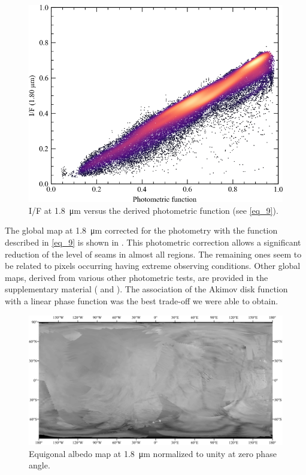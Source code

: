 \documentclass{arxiv-icarus}
\begin{document}
\begin{figure}[!ht]
    \includegraphics[width=.9\linewidth]{Fig_6}
    \caption{I/F at \SI{1.8}{\um} versus the derived photometric function (see \eqref{eq_9}).}
    \label{fig:fig_6}
\end{figure}

The global map at \SI{1.8}{\um} corrected for the photometry with the function described in \eqref{eq_9} is shown in . This photometric correction allows a significant reduction of the level of seams in almost all regions. The remaining ones seem to be related to pixels occurring having extreme observing conditions. Other global maps, derived from various other photometric tests, are provided in the supplementary material ( and ). The association of the Akimov disk function with a linear phase function was the best trade-off we were able to obtain.

\begin{figure}[!ht]
    \includegraphics[width=.9\linewidth]{Fig_7}
    \caption{Equigonal albedo map at \SI{1.8}{\um} normalized to unity at zero phase angle.}
    \label{fig:fig_7}
\end{figure}
\end{document}

